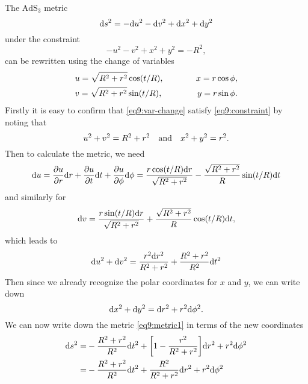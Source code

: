 \documentclass[11pt,a4paper, 
swedish, english %
]{article}
\begin{document}
The $\text{AdS}_3$ metric
\begin{equation}\label{eq9:metric1}
\mathrm{d}{s}^2=-\mathrm{d}{u}^2-\mathrm{d}{v}^2+\mathrm{d}{x}^2+\mathrm{d}{y}^2
\end{equation}
under the constraint
\begin{equation}\label{eq9:constraint}
-u^2-v^2+x^2+y^2=-R^2,
\end{equation}
can be rewritten using the change of variables
\begin{equation}\label{eq9:var-change}
\begin{aligned}
&u=\sqrt{R^2+r^2}\cos(t/R)
\qc\qquad &x=r\cos\phi, \\
&v=\sqrt{R^2+r^2}\sin(t/R)
\qc\qquad &y=r\sin\phi.
\end{aligned}
\end{equation}
Firstly it is easy to confirm that \eqref{eq9:var-change} satisfy
\eqref{eq9:constraint} by noting that
\begin{equation}
u^2+v^2=R^2+r^2\qand
x^2+y^2=r^2.
\end{equation}
Then to calculate the metric, we need
\begin{equation}
\mathrm{d}{u}=\pdv{u}{r}\mathrm{d}{r}+\pdv{u}{t}\mathrm{d}{t}+\pdv{u}{\phi}\mathrm{d}\phi
=\frac{r\cos(t/R)\mathrm{d}{r}}{\sqrt{R^2+r^2}}
-\frac{\sqrt{R^2+r^2}}{R}\sin(t/R)\mathrm{d}{t}
\end{equation}
and similarly for
\begin{equation}
\mathrm{d}{v}=\frac{r\sin(t/R)\mathrm{d}{r}}{\sqrt{R^2+r^2}}
+\frac{\sqrt{R^2+r^2}}{R}\cos(t/R)\mathrm{d}{t},
\end{equation}
which leads to
\begin{equation}
\mathrm{d}{u}^2+\mathrm{d}{v}^2=
\frac{r^2\mathrm{d}{r}^2}{R^2+r^2}+\frac{R^2+r^2}{R^2}\mathrm{d}{t}^2
\end{equation}
Then since we already recognize the polar coordinates for $x$ and $y$,
we can write down
\begin{equation}
\mathrm{d}{x}^2+\mathrm{d}{y}^2=\mathrm{d}{r}^2+r^2\mathrm{d}\phi^2.
\end{equation}
We can now write down the metric \eqref{eq9:metric1} in terms of the
new coordinates
\begin{equation}
\begin{aligned}
\mathrm{d}{s}^2=&-\frac{R^2+r^2}{R^2}\mathrm{d}{t}^2
+\qty[1-\frac{r^2}{R^2+r^2}]\mathrm{d}{r}^2+r^2\mathrm{d}\phi^2\\
=&-\frac{R^2+r^2}{R^2}\mathrm{d}{t}^2
+\frac{R^2}{R^2+r^2}\mathrm{d}{r}^2+r^2\mathrm{d}\phi^2
\end{aligned}
\end{equation}
\end{document}
